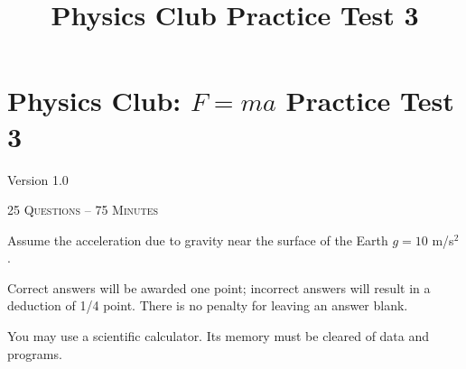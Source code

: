 \documentclass[12pt,letterpaper]{article}
\title{Physics Club Practice Test 3}
\begin{document}
\section*{Physics Club: $F=ma$ Practice Test 3}\hfill Version 1.0
\vspace{-2.5pt}
\begin{center}
\textsc{25 Questions -- 75 Minutes}
\end{center}
\vspace{-5pt}
Assume the acceleration due to gravity near the surface of the Earth $g = 10$ m/s$^2$.
\smallskip

Correct answers will be awarded one point; incorrect answers will result in a deduction of 1/4 point. There is no penalty for leaving an answer blank.
\smallskip

You may use a scientific calculator. Its memory must be cleared of data and programs.

\hrulefill
\end{document}

